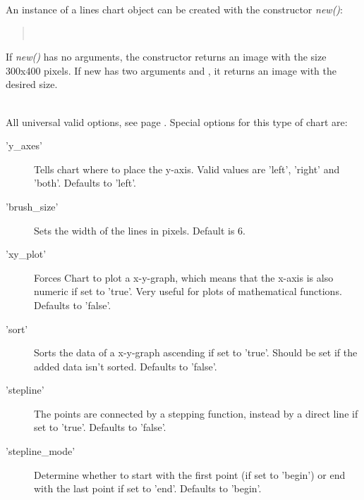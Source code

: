 \begin{Constructor} 
An instance of a lines chart object can be created with the constructor \textit{new()}:
\begin{quote}
\\
\end{quote}
If \textit{new()} has no arguments, 
the constructor returns an image with the size 300x400 pixels. If new has two arguments
 and , it returns an image with the desired size.
\end{Constructor}

\Methods
{}\\[\parabstand]
%
\Attributes
All universal valid options, see page \pageref{options}. 
Special options for this type of chart are:\\
\begin{description}
\item['y\_axes'] Tells chart where to place the y-axis. 
                 Valid values are 'left', 'right' and 'both'. Defaults to 'left'.

\item['brush\_size'] Sets the width of the lines in pixels. Default is 6.

\item['xy\_plot'] Forces Chart to plot a x-y-graph, which means that the x-axis 
                  is also numeric if set to 'true'. 
                  Very useful for plots of mathematical functions. Defaults to 'false'.

\item['sort'] Sorts the data of a x-y-graph ascending if set to 'true'. 
              Should be set if the added data isn't sorted. Defaults to 'false'.   

\item['stepline'] The points are connected by a stepping function,
                  instead by a direct line if set to 'true'. 
                  Defaults to 'false'.   

\item['stepline\_mode'] Determine whether to start with the first point
                    (if set to 'begin') or end with the last point if set to 'end'.
                    Defaults to 'begin'.   
\end{description}


